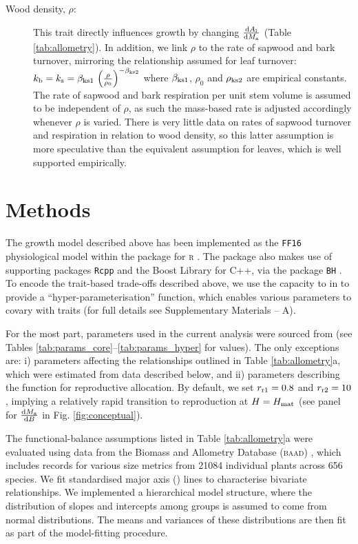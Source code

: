 \documentclass[a4paper,11pt]{article}
\begin{document}
\begin{description}
\item[Wood density, $\rho$:] This trait directly influences growth by changing $\frac{{\rm d}A_{\rm l}}{{\rm d}M_{\rm a}}$ (Table \ref{tab:allometry}). In addition, we link $\rho$ to the rate of sapwood and bark turnover, mirroring the relationship assumed for leaf turnover: $k_{\rm b} = k_{\rm s} = \beta_{{\rm ks1}} \, \left(\frac{\rho}{\rho_0}\right)^{-\beta_{{\rm ks2}}}$ where $\beta_{{\rm ks1}}$, $\rho_0$ and $\rho_{{\rm ks2}}$ are empirical constants. The rate of sapwood and bark respiration per unit stem volume is assumed to be independent of $\rho$, as such the mass-based rate is adjusted accordingly whenever $\rho$ is varied. There is very little data on rates of sapwood turnover and respiration in relation to wood density, so this latter assumption is more speculative than the equivalent assumption for leaves, which is well supported empirically.
 \end{description}

\section{Methods}

The growth model described above has been implemented as the \texttt{FF16} physiological model within the {\plant} package \citep{Falster-2016} for \textsc{r} \citep{R-2015}. The {\plant} package also makes use of supporting packages \texttt{Rcpp} \citep{Eddelbuettel-2013} and the Boost Library for C++\citep{Schaling-2014}, via the package \texttt{BH} \citep{Eddelbuettel-2015}. To encode the trait-based trade-offs described above, we use the capacity to in {\plant} to provide a ``hyper-parameterisation'' function, which enables various parameters to covary with traits (for full details see Supplementary Materials -- A).

For the most part, parameters used in the current analysis were sourced from \citet{Falster-2016} (see Tables \ref{tab:params_core}--\ref{tab:params_hyper} for values). The only exceptions are: i) parameters affecting the relationships outlined in Table \ref{tab:allometry}a, which were estimated from data described below, and ii) parameters describing the function for reproductive allocation. By default, we set $r_{\rm r1}=0.8$ and $r_{\rm r2}=10$, implying a relatively rapid transition to reproduction at $H=H_{{\rm mat}}$ (see panel for $\frac{{\rm d}M_{{\rm a}}}{{\rm d}B}$ in Fig. \ref{fig:conceptual}).

The functional-balance assumptions listed in Table \ref{tab:allometry}a were evaluated using data from the Biomass and Allometry Database (\textsc{baad}) \citep{Falster-2015b}, which includes records for various size metrics from 21084 individual plants across 656 species. We fit standardised major axis ({\sma}) lines \citep{Warton-2006} to characterise bivariate relationships. We implemented a hierarchical model structure, where the distribution of slopes and intercepts among groups is assumed to come from normal distributions. The means and variances of these distributions are then fit as part of the model-fitting procedure.
\end{document}
